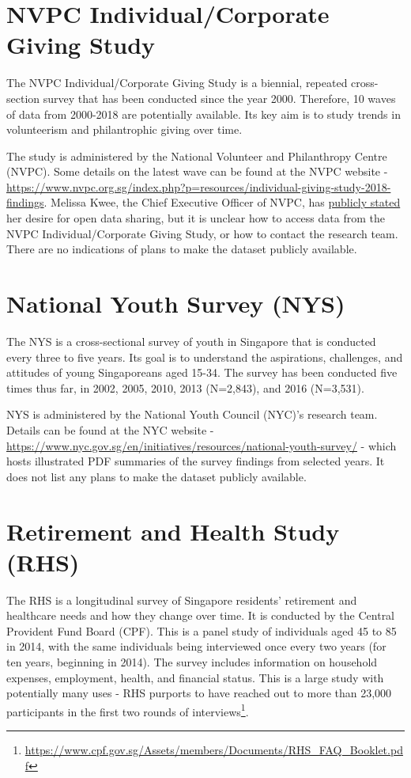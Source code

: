 \documentclass[
  openany]{book}
\begin{document}
\hypertarget{nvpc-igs}{%
\section{NVPC Individual/Corporate Giving Study}\label{nvpc-igs}}

The NVPC Individual/Corporate Giving Study is a biennial, repeated cross-section survey that has been conducted since the year 2000. Therefore, 10 waves of data from 2000-2018 are potentially available. Its key aim is to study trends in volunteerism and philantrophic giving over time.

The study is administered by the National Volunteer and Philanthropy Centre (NVPC). Some details on the latest wave can be found at the NVPC website - \url{https://www.nvpc.org.sg/index.php?p=resources/individual-giving-study-2018-findings}. Melissa Kwee, the Chief Executive Officer of NVPC, has \href{https://www.todayonline.com/commentary/keeping-passion-alive-trying-change-world}{publicly stated} her desire for open data sharing, but it is unclear how to access data from the NVPC Individual/Corporate Giving Study, or how to contact the research team. There are no indications of plans to make the dataset publicly available.

\hypertarget{nys}{%
\section{National Youth Survey (NYS)}\label{nys}}

The NYS is a cross-sectional survey of youth in Singapore that is conducted every three to five years. Its goal is to understand the aspirations, challenges, and attitudes of young Singaporeans aged 15-34. The survey has been conducted five times thus far, in 2002, 2005, 2010, 2013 (N=2,843), and 2016 (N=3,531).

NYS is administered by the National Youth Council (NYC)'s research team. Details can be found at the NYC website - \url{https://www.nyc.gov.sg/en/initiatives/resources/national-youth-survey/} - which hosts illustrated PDF summaries of the survey findings from selected years. It does not list any plans to make the dataset publicly available.

\hypertarget{rhs}{%
\section{Retirement and Health Study (RHS)}\label{rhs}}

The RHS is a longitudinal survey of Singapore residents' retirement and healthcare needs and how they change over time. It is conducted by the Central Provident Fund Board (CPF). This is a panel study of individuals aged 45 to 85 in 2014, with the same individuals being interviewed once every two years (for ten years, beginning in 2014). The survey includes information on household expenses, employment, health, and financial status. This is a large study with potentially many uses - RHS purports to have reached out to more than 23,000 participants in the first two rounds of interviews\footnote{\url{https://www.cpf.gov.sg/Assets/members/Documents/RHS_FAQ_Booklet.pdf}}.
\end{document}
